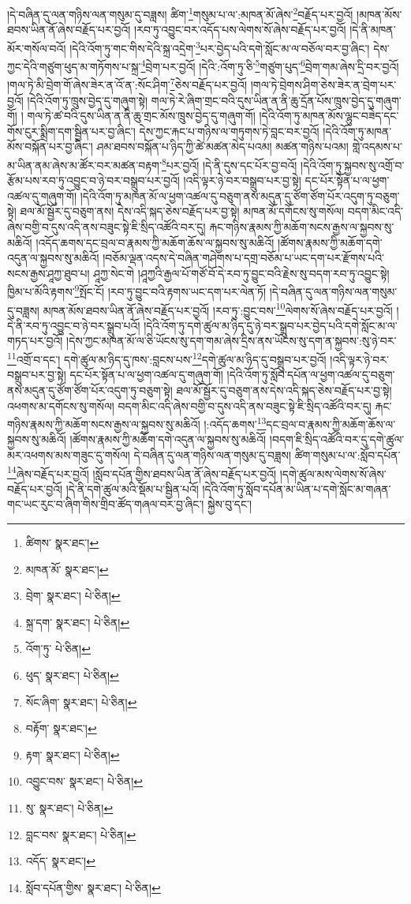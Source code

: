 །དེ་བཞིན་དུ་ལན་གཉིས་ལན་གསུམ་དུ་བཟླས། ཚིག་\footnote{ཚིགས་  སྣར་ཐང་། }གསུམ་པ་ལ་:མཁན་མོ་ཞེས་\footnote{མཁན་མོ་  སྣར་ཐང་། }བརྗོད་པར་བྱའོ། །མཁན་མོས་ཐབས་ཡིན་ནོ་ཞེས་བརྗོད་པར་བྱའོ། །རབ་ཏུ་འབྱུང་བར་འདོད་པས་ལེགས་སོ་ཞེས་བརྗོད་པར་བྱའོ། །དེ་ནི་མཁན་མོར་གསོལ་བའོ། །དེའི་འོག་ཏུ་གང་གིས་དེའི་སྐྲ་འདྲེག་\footnote{བྲེག་  སྣར་ཐང་།  པེ་ཅིན། }པར་བྱེད་པའི་དགེ་སློང་མ་ལ་བཅོལ་བར་བྱ་ཞིང་། དེས་ཀྱང་དེའི་གཙུག་ཕུད་མ་གཏོགས་པ་སྐྲ་\footnote{སྐྲ་དག་  སྣར་ཐང་།  པེ་ཅིན། }བྲེག་པར་བྱའོ། །དེའི་:འོག་ཏུ་ཅི་\footnote{འོག་ཏུ་  པེ་ཅིན། }གཙུག་པུད་\footnote{ཕུད་  སྣར་ཐང་།  པེ་ཅིན། }བྲེག་གམ་ཞེས་དྲི་བར་བྱའོ། །གལ་ཏེ་མི་བྲེག་གོ་ཞེས་ཟེར་ན་འོ་ན་:སོང་ཤིག་\footnote{སོང་ཞིག་  སྣར་ཐང་།  པེ་ཅིན། }ཅེས་བརྗོད་པར་བྱའོ། །གལ་ཏེ་བྲེགས་ཤིག་ཅེས་ཟེར་ན་བྲེག་པར་བྱའོ། །དེའི་འོག་ཏུ་ཁྲུས་བྱེད་དུ་གཞུག་སྟེ། གལ་ཏེ་རེ་ཞིག་གྲང་བའི་དུས་ཡིན་ན་ནི་ཆུ་དྲོན་པོས་ཁྲུས་བྱེད་དུ་གཞུག་གོ། །
གལ་ཏེ་ཚ་བའི་དུས་ཡིན་ན་ནི་ཆུ་གྲང་མོས་ཁྲུས་བྱེད་དུ་གཞུག་གོ། །དེའི་འོག་ཏུ་མཁན་མོས་ལྷུང་བཟེད་དང་གོས་ངུར་སྨྲིག་དག་སྦྱིན་པར་བྱ་ཞིང་། དེས་ཀྱང་རྐང་པ་གཉིས་ལ་གཏུགས་ཏེ་བླང་བར་བྱའོ། །དེའི་འོག་ཏུ་མཁན་མོས་བསྐོན་པར་བྱ་ཞིང་། ཤམ་ཐབས་བསྐོན་པ་ཉིད་ཀྱི་ཚེ་མཚན་མེད་པའམ། མཚན་གཉིས་པའམ། གླེ་འདམས་པ་མ་ཡིན་ནམ་ཞེས་མ་ཚོར་བར་མཚན་བརྟག་\footnote{བརྟོག་  སྣར་ཐང་། }པར་བྱའོ། །དེ་ནི་དུས་དང་པོར་བྱ་བའོ། །དེའི་འོག་ཏུ་སྐྱབས་སུ་འགྲོ་བ་རྩོམ་པས་རབ་ཏུ་འབྱུང་བ་ཉེ་བར་བསྒྲུབ་པར་བྱའོ། །འདི་ལྟར་ཉེ་བར་བསྒྲུབ་པར་བྱ་སྟེ། དང་པོར་སྟོན་པ་ལ་ཕྱག་འཚལ་དུ་གཞུག་གོ། །དེའི་འོག་ཏུ་མཁན་མོ་ལ་ཕྱག་འཚལ་དུ་བཅུག་ནས་མདུན་དུ་ཙོག་ཙོག་པོར་འདུག་ཏུ་བཅུག་སྟེ། ཐལ་མོ་སྦྱོར་དུ་བཅུག་ནས། དེས་འདི་སྐད་ཅེས་བརྗོད་པར་བྱ་སྟེ། མཁན་མོ་དགོངས་སུ་གསོལ། བདག་མིང་འདི་ཞེས་བགྱི་བ་དུས་འདི་ནས་བཟུང་སྟེ་ཇི་སྲིད་འཚོའི་བར་དུ། རྐང་གཉིས་རྣམས་ཀྱི་མཆོག་སངས་རྒྱས་ལ་སྐྱབས་སུ་མཆིའོ། །འདོད་ཆགས་དང་བྲལ་བ་རྣམས་ཀྱི་མཆོག་ཆོས་ལ་སྐྱབས་སུ་མཆིའོ། །ཚོགས་རྣམས་ཀྱི་མཆོག་དགེ་འདུན་ལ་སྐྱབས་སུ་མཆིའོ། །བཅོམ་ལྡན་འདས་དེ་བཞིན་གཤེགས་པ་དགྲ་བཅོམ་པ་ཡང་དག་པར་རྫོགས་པའི་སངས་རྒྱས་ཤཱཀྱ་ཐུབ་པ། ཤཱཀྱ་སེང་གེ །ཤཱཀྱའི་རྒྱལ་པོ་གཙོ་བོ་དེ་རབ་ཏུ་བྱུང་བའི་རྗེས་སུ་བདག་རབ་ཏུ་འབྱུང་སྟེ། ཁྱིམ་པ་མོའི་རྟགས་\footnote{རྟག་  སྣར་ཐང་།  པེ་ཅིན། }སྤོང་ངོ། །རབ་ཏུ་བྱུང་བའི་རྟགས་ཡང་དག་པར་ལེན་ཏོ། །དེ་བཞིན་དུ་ལན་གཉིས་ལན་གསུམ་དུ་བཟླས། མཁན་མོས་ཐབས་ཡིན་ནོ་ཞེས་བརྗོད་པར་བྱའོ། །རབ་ཏུ་:བྱུང་བས་\footnote{འབྱུང་བས་  སྣར་ཐང་།  པེ་ཅིན། }ལེགས་སོ་ཞེས་བརྗོད་པར་བྱའོ། །དེ་ནི་རབ་ཏུ་འབྱུང་བ་ཉེ་བར་སྒྲུབ་པའོ། །དེའི་འོག་ཏུ་དགེ་ཚུལ་མ་ཉིད་དུ་ཉེ་བར་སྒྲུབ་པར་བྱེད་པའི་དགེ་སློང་མ་ལ་གཏད་པར་བྱའོ། །དེས་ཀྱང་མཁན་མོ་ལ་ཅི་ཡོངས་སུ་དག་གམ་ཞེས་དྲིས་ནས་ཡོངས་སུ་དག་ན་སྐྱབས་:སུ་ཉེ་བར་\footnote{སུ་  སྣར་ཐང་།  པེ་ཅིན། }འགྲོ་བ་དང་། དགེ་ཚུལ་མ་ཉིད་དུ་ཁས་:བླངས་པས་\footnote{བླང་བས་  སྣར་ཐང་།  པེ་ཅིན། }དགེ་ཚུལ་མ་ཉིད་དུ་བསྒྲུབ་པར་བྱའོ། །འདི་ལྟར་ཉེ་བར་བསྒྲུབ་པར་བྱ་སྟེ། དང་པོར་སྟོན་པ་ལ་ཕྱག་འཚལ་དུ་གཞུག་གོ། །དེའི་འོག་ཏུ་སློབ་དཔོན་ལ་ཕྱག་འཚལ་དུ་བཅུག་ནས་མདུན་དུ་ཙོག་ཙོག་པོར་འདུག་ཏུ་བཅུག་སྟེ། ཐལ་མོ་སྦྱོར་དུ་བཅུག་ནས་དེས་འདི་སྐད་ཅེས་བརྗོད་པར་བྱ་སྟེ། འཕགས་མ་དགོངས་སུ་གསོལ། བདག་མིང་འདི་ཞེས་བགྱི་བ་དུས་འདི་ནས་བཟུང་སྟེ་ཇི་སྲིད་འཚོའི་བར་དུ། རྐང་གཉིས་རྣམས་ཀྱི་མཆོག་སངས་རྒྱས་ལ་སྐྱབས་སུ་མཆིའོ། །:འདོད་ཆགས་\footnote{འདོད་  སྣར་ཐང་། }དང་བྲལ་བ་རྣམས་ཀྱི་མཆོག་ཆོས་ལ་སྐྱབས་སུ་མཆིའོ། །ཚོགས་རྣམས་ཀྱི་མཆོག་དགེ་འདུན་ལ་སྐྱབས་སུ་མཆིའོ། །བདག་ཇི་སྲིད་འཚོའི་བར་དུ་དགེ་ཚུལ་མར་འཕགས་མས་གཟུང་དུ་གསོལ། དེ་བཞིན་དུ་ལན་གཉིས་ལན་གསུམ་དུ་བཟླས། ཚིག་གསུམ་པ་ལ་:སློབ་དཔོན་\footnote{སློབ་དཔོན་གྱིས་  སྣར་ཐང་།  པེ་ཅིན། }ཞེས་བརྗོད་པར་བྱའོ། །སློབ་དཔོན་གྱིས་ཐབས་ཡིན་ནོ་ཞེས་བརྗོད་པར་བྱའོ། །དགེ་ཚུལ་མས་ལེགས་སོ་ཞེས་བརྗོད་པར་བྱའོ། །དེ་ནི་དགེ་ཚུལ་མའི་སྡོམ་པ་སྦྱིན་པའོ། །དེའི་འོག་ཏུ་སློབ་དཔོན་མ་ཡིན་པ་དགེ་སློང་མ་གཞན་གང་ཡང་རུང་བ་ཞིག་གིས་གྲིབ་ཚོད་གཞལ་བར་བྱ་ཞིང་། སྐྱེས་བུ་དང་། 